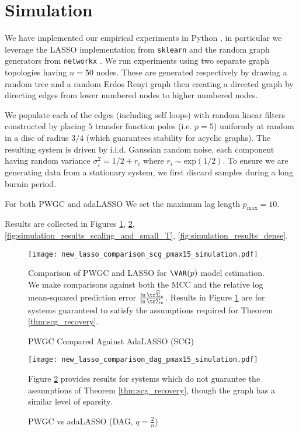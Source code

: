 \section{Simulation}
\label{apx:simulation}
We have implemented our empirical experiments in Python \cite{scipy},
in particular we leverage the LASSO implementation from
\texttt{sklearn} \cite{sklearn} and the random graph generators from
\texttt{networkx} \cite{networkx}.  We run experiments using two
separate graph topologies having $n = 50$ nodes. These are generated
respectively by drawing a random tree and a random Erdos Renyi graph
then creating a directed graph by directing edges from lower numbered
nodes to higher numbered nodes.

We populate each of the edges (including self loops) with random
linear filters constructed by placing $5$ transfer function poles
(i.e. $p = 5$) uniformly at random in a disc of radius $3 / 4$ (which
guarantees stability for acyclic graphs).  The resulting system is
driven by i.i.d. Gaussian random noise, each component having random
variance $\sigma_i^2 = 1/2 + r_i$ where $r_i \sim \text{exp}(1/2)$.  To ensure
we are generating data from a stationary system, we first discard
samples during a long burnin period.

For both PWGC and adaLASSO We set the maximum lag length
$p_{\text{max}} = 10$.

Results are collected in Figures
\ref{fig:simulation_results_comparison1},
\ref{fig:simulation_results_comparison2},
\ref{fig:simulation_results_scaling_and_small_T},
\ref{fig:simulation_results_dense}.

\begin{figure}
  \centering
  \caption{PWGC Compared Against AdaLASSO \cite{adaptive_lasso_zou2006} (SCG)}
  \label{fig:simulation_results_comparison1}
  \texttt{[image: new\_lasso\_comparison\_scg\_pmax15\_simulation.pdf]}

  {\footnotesize Comparison of PWGC and LASSO for $\VAR(p)$ model
    estimation.  We make comparisons against both the MCC and the
    relative log mean-squared prediction error
    $\frac{\ln\tr \widehat{\Sigma}_v}{\ln\tr \Sigma_v}$.  Results
    in Figure \ref{fig:simulation_results_comparison1} are for systems
    guaranteed to satisfy the assumptions required for Theorem
    \ref{thm:scg_recovery}.}
\end{figure}

\begin{figure}
  \caption{PWGC vs adaLASSO (DAG, $q = \frac{2}{n}$)}
  \label{fig:simulation_results_comparison2}
  \texttt{[image: new\_lasso\_comparison\_dag\_pmax15\_simulation.pdf]}

  {\footnotesize Figure \ref{fig:simulation_results_comparison2}
    provides results for systems which do not guarantee the
    assumptions of Theorem \ref{thm:scg_recovery}, though the graph
    has a similar level of sparsity.}
\end{figure}

